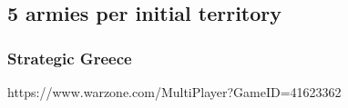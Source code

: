 \subsection{5 armies per initial territory}

\subsubsection{Strategic Greece}

https://www.warzone.com/MultiPlayer?GameID=41623362